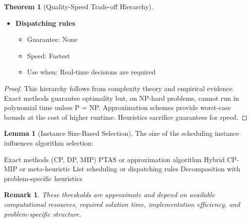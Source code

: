 \documentclass{article}
\newtheorem{remark}{Remark}
\theoremstyle{definition}
\newtheorem{theorem}{Theorem}
\newtheorem{lemma}{Lemma}
\begin{document}
\begin{theorem}[Quality-Speed Trade-off Hierarchy]
\begin{itemize}
    \item \textbf{Dispatching rules}
    \begin{itemize}
        \item Guarantee: None
        \item Speed: Fastest
        \item Use when: Real-time decisions are required
    \end{itemize}
\end{itemize}

\begin{proof}
This hierarchy follows from complexity theory and empirical evidence. Exact methods guarantee optimality but, on NP-hard problems, cannot run in polynomial time unless P = NP. Approximation schemes provide worst-case bounds at the cost of higher runtime. Heuristics sacrifice guarantees for speed.
\end{proof}
\end{theorem}

\begin{lemma}[Instance Size-Based Selection]
The size of the scheduling instance influences algorithm selection:

\begin{algorithm}
\caption{Algorithm Selection Based on Instance Size}
\begin{algorithmic}[1]
        \State \Return Exact methods (CP, DP, MIP)
        \State \Return PTAS or approximation algorithm
        \State \Return Hybrid CP-MIP or meta-heuristic
        \State \Return List scheduling or dispatching rules
    \Else
        \State \Return Decomposition with problem-specific heuristics
    \EndIf
\EndProcedure
\end{algorithmic}
\end{algorithm}

\begin{remark}
These thresholds are approximate and depend on available computational resources, required solution time, implementation efficiency, and problem-specific structure.
\end{remark}
\end{lemma}
\end{document}
